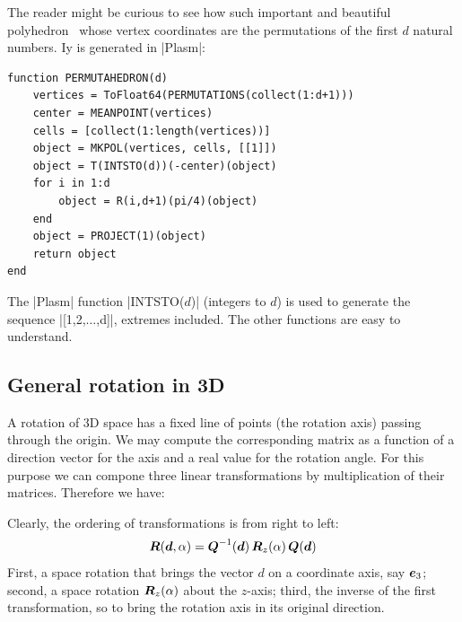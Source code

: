 \begin{coding}[Permutahedron] The reader might be curious to see how such important and beautiful polyhedron~\cite{wiki:pao:100} whose vertex coordinates are the permutations of the first $d$ natural numbers. Iy is generated in |Plasm|:
\begin{lstlisting}[language=JuliaLocal, style=julia, mathescape=false]
function PERMUTAHEDRON(d)
	vertices = ToFloat64(PERMUTATIONS(collect(1:d+1)))
	center = MEANPOINT(vertices)
	cells = [collect(1:length(vertices))]
	object = MKPOL(vertices, cells, [[1]])
	object = T(INTSTO(d))(-center)(object)
	for i in 1:d
		object = R(i,d+1)(pi/4)(object)
	end
	object = PROJECT(1)(object)
	return object
end
\end{lstlisting}
The |Plasm| function |INTSTO($d$)| (integers to $d$) is used to generate the sequence |[1,2,$\ldots$,d]|, extremes included. The other functions are easy to understand.
\end{coding}




\subsection*{General rotation in 3D}

A rotation of 3D space has a fixed line of points (the rotation axis) passing through the origin. We may compute the corresponding matrix as a function of a direction vector for the axis and a real value for the rotation angle. For this purpose we can compone three linear transformations by multiplication of their matrices.  Therefore we have:

\begin{definition}
Clearly, the ordering of transformations is from right to left:
\[
{\mbox{\boldmath $R$}}({\mbox{\boldmath $d$}},\alpha) = {\mbox{\boldmath $Q$}}^{-1}({\mbox{\boldmath $d$}})\, {\mbox{\boldmath $R$}}_z(\alpha)\, {\mbox{\boldmath $Q$}}({\mbox{\boldmath $d$}})
\]
First, a space rotation that brings the vector $d$ on a coordinate axis, say ${\mbox{\boldmath $e$}}_3$; second, a space rotation ${\mbox{\boldmath $R$}}_z(\alpha)$ about the $z$-axis; third, the inverse of the first transformation, so to bring the rotation axis in its original direction.
\end{definition}


